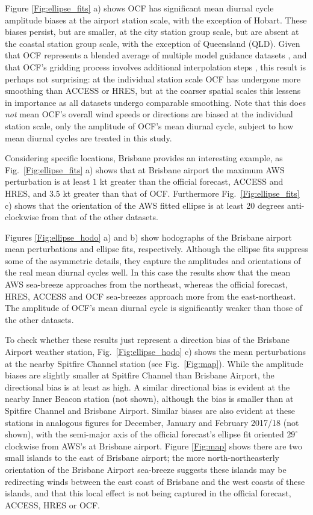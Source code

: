 \documentclass{ametsoc}
\begin{document}
Figure \ref{Fig:ellipse_fits} a) shows OCF has significant mean diurnal cycle amplitude biases at the airport station scale, with the exception of Hobart. These biases persist, but are smaller, at the city station group scale, but are absent at the coastal station group scale, with the exception of  Queensland (QLD). Given that OCF represents a blended average of multiple model guidance datasets \citep{engel07}, and that OCF's gridding process involves additional interpolation steps \citep{bom08, bom12}, this result is perhaps not surprising: at the individual station scale OCF has undergone more smoothing than ACCESS or HRES, but at the coarser spatial scales this lessens in importance as all datasets undergo comparable smoothing. Note that this does \textit{not} mean OCF's overall wind speeds or directions are biased at the individual station scale, only the amplitude of OCF's mean diurnal cycle, subject to how mean diurnal cycles are treated in this study. 

Considering specific locations, Brisbane provides an interesting example, as Fig.~\ref{Fig:ellipse_fits} a) shows that at Brisbane airport the maximum AWS perturbation is at least $1$ kt greater than the official forecast, ACCESS and HRES, and $3.5$ kt greater than that of OCF. Furthermore Fig.~\ref{Fig:ellipse_fits} c) shows that the orientation of the AWS fitted ellipse is at least 20 degrees anti-clockwise from that of the other datasets. 

Figures \ref{Fig:ellipse_hodo} a) and b) show hodographs of the Brisbane airport mean perturbations and ellipse fits, respectively. Although the ellipse fits suppress some of the asymmetric details, they capture the amplitudes and orientations of the real mean diurnal cycles well. In this case the results show that the mean AWS sea-breeze approaches from the northeast, whereas the official forecast, HRES, ACCESS and OCF sea-breezes approach more from the east-northeast. The amplitude of OCF's mean diurnal cycle is significantly weaker than those of the other datasets.  

To check whether these results just represent a direction bias of the Brisbane Airport weather station, Fig.~\ref{Fig:ellipse_hodo} c) shows the mean perturbations at the nearby Spitfire Channel station (see Fig.~\ref{Fig:map}). While the amplitude biases are slightly smaller at Spitfire Channel than Brisbane Airport, the directional bias is at least as high. A similar directional bias is evident at the nearby Inner Beacon station (not shown), although the bias is smaller than at Spitfire Channel and Brisbane Airport. Similar biases are also evident at these stations in analogous figures for December, January and February 2017/18 (not shown), with the semi-major axis of the official forecast's ellipse fit oriented $29^\circ$ clockwise from AWS's at Brisbane airport. Figure \ref{Fig:map} shows there are two small islands to the east of Brisbane airport; the more north-northeasterly orientation of the Brisbane Airport sea-breeze suggests these islands may be redirecting winds between the east coast of Brisbane and the west coasts of these islands, and that this local effect is not being captured in the official forecast, ACCESS, HRES or OCF.  
\end{document}
